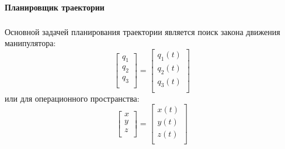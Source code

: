 \paragraph*{Планировщик траектории}$\phantom{-}$\\

\hspace*{\parindent} Основной задачей планирования траектории является поиск закона движения манипулятора:
\begin{equation}\label{eq:model}
    \begin{bmatrix}
    q_{1} \\
    q_{2} \\
    q_{3} \\
    \end{bmatrix}
    =
     \begin{bmatrix}
    q_{1}(t) \\
    q_{2}(t) \\
    q_{3}(t) \\
    \end{bmatrix}
\end{equation} 
или для операционного пространства:
\begin{equation} 
    \begin{bmatrix}
    x \\
    y \\
    z \\
    \end{bmatrix}
    =
     \begin{bmatrix}
    x(t) \\
    y(t) \\
    z(t) \\
    \end{bmatrix}
\end{equation}




